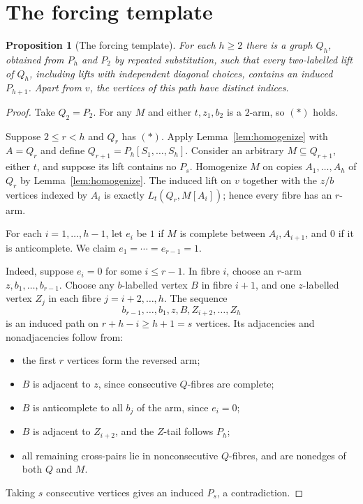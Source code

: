\documentclass[11pt,a4paper]{article}
\newtheorem{proposition}[theorem]{Proposition}
\theoremstyle{definition}
\theoremstyle{remark}
\numberwithin{equation}{section}
\begin{document}
\section{The forcing template}\label{sec:arm}
\begin{proposition}[The forcing template]\label{prop:forcing}
For each \(h\ge2\) there is a graph \(Q_h\), obtained from \(P_h\) and \(P_2\) by repeated substitution, such that every two-labelled lift of \(Q_h\), including lifts with independent diagonal choices, contains an induced \(P_{h+1}\). Apart from \(v\), the vertices of this path have distinct indices.
\end{proposition}\begin{proof}
Take \(Q_{2}=P_{2}\). For any \(M\) and either \(t,\allowbreak  z_{1},\allowbreak b_{2}\) is a \(2\)-arm, so \((\ast)\) holds.

Suppose \(2\le\allowbreak r<h\) and \(Q_{r}\) has \((\ast)\). Apply Lemma~\ref{lem:homogenize} with \(A=Q_{r}\) and define \(Q_{r+1} = P_{h}[S_{1},\ldots,S_{h}]\). Consider an arbitrary \(M \subseteq  Q_{r+1}\), either \(t\), and suppose its lift contains no \(P_{s}\). Homogenize \(M\) on copies \(A_{1},\ldots,A_{h}\) of \(Q_{r}\) by Lemma~\ref{lem:homogenize}. The induced lift on \(v\) together with the \(z/b\) vertices indexed by \(A_{i}\) is exactly \(L_{t}(Q_{r},\allowbreak M[A_{i}])\); hence every fibre has an \(r\)-arm.

For each \(i=1,\ldots,h-1\), let \(e_{i}\) be \(1\) if \(M\) is complete between \(A_{i},\allowbreak A_{i+1}\), and \(0\) if it is anticomplete. We claim \(e_{1}=\cdots=e_{r-1}=1\).

Indeed, suppose \(e_i=0\) for some \(i\le r-1\). In fibre \(i\), choose an \(r\)-arm \(z,b_1,\ldots,b_{r-1}\). Choose any \(b\)-labelled vertex \(B\) in fibre \(i+1\), and one \(z\)-labelled vertex \(Z_j\) in each fibre \(j=i+2,\ldots,h\). The sequence
\[
 b_{r-1},\ldots,b_1,z,B,Z_{i+2},\ldots,Z_h
\]
is an induced path on \(r+h-i\ge h+1=s\) vertices. Its adjacencies and nonadjacencies follow from:
\begin{itemize}
\item the first \(r\) vertices form the reversed arm;
\item \(B\) is adjacent to \(z\), since consecutive \(Q\)-fibres are complete;
\item \(B\) is anticomplete to all \(b_j\) of the arm, since \(e_i=0\);
\item \(B\) is adjacent to \(Z_{i+2}\), and the \(Z\)-tail follows \(P_h\);
\item all remaining cross-pairs lie in nonconsecutive \(Q\)-fibres, and are nonedges of both \(Q\) and \(M\).
\end{itemize}
Taking \(s\) consecutive vertices gives an induced \(P_s\), a contradiction.


\end{proof}
\end{document}
